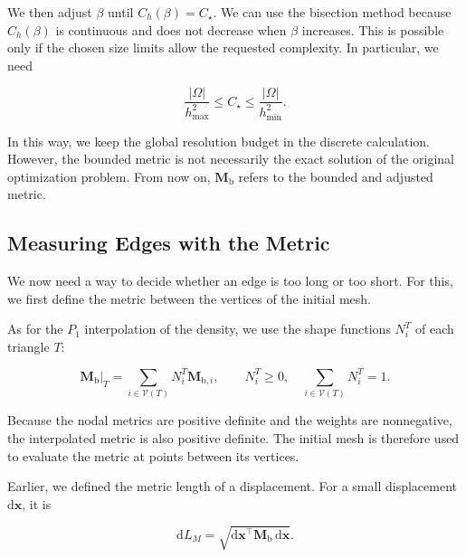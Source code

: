 \documentclass[11pt,a4paper]{article}
\begin{document}
\noindent We then adjust $\beta$ until $C_h(\beta)=C_\star$.
We can use the bisection method because $C_h(\beta)$ is
continuous and does not decrease when $\beta$ increases.
This is possible only if the chosen size limits allow the
requested complexity. In particular, we need

\begin{equation}
    \label{eq:feasible_complexity_interval}
    \frac{|\Omega|}{h_{\max}^2}
    \leq C_\star\leq
    \frac{|\Omega|}{h_{\min}^2}.
\end{equation}

\noindent In this way, we keep the global resolution budget
in the discrete calculation. However, the bounded metric
is not necessarily the exact solution of the original
optimization problem. From now on, $\mathbf M_{\mathrm b}$
refers to the bounded and adjusted metric.

\subsection{Measuring Edges with the Metric}

\noindent We now need a way to decide whether an edge is too
long or too short. For this, we first define the metric
between the vertices of the initial mesh.

\noindent As for the $P_1$ interpolation of the density,
we use the shape functions $N_i^T$ of each triangle $T$:

\begin{equation}
    \label{eq:interpolated_metric}
    \mathbf M_{\mathrm b}\big|_T
    =\sum_{i\in\mathcal V(T)}
    N_i^T\mathbf M_{\mathrm b,i},
    \qquad N_i^T\geq0,
    \quad\sum_{i\in\mathcal V(T)}N_i^T=1.
\end{equation}

\noindent Because the nodal metrics are positive definite
and the weights are nonnegative, the interpolated metric
is also positive definite. The initial mesh is therefore
used to evaluate the metric at points between its vertices.

\medskip

\noindent Earlier, we defined the metric length of a displacement.
For a small displacement $\mathrm d\mathbf x$, it is

\begin{equation*}
    \mathrm dL_M
    =\sqrt{\mathrm d\mathbf x^\top
    \mathbf M_{\mathrm b}\,\mathrm d\mathbf x}.
\end{equation*}
\end{document}
